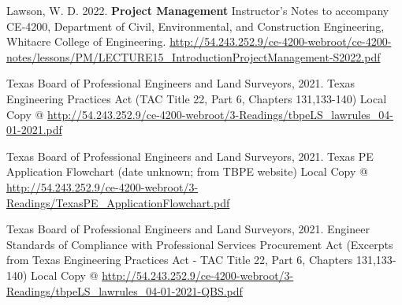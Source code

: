 \documentclass[12pt]{article}
\begin{document}
\begin{thebibliography}{}
Lawson, W. D. 2022. \textbf{Project Management} Instructor's Notes to accompany CE-4200, Department of Civil, Environmental, and Construction Engineering, Whitacre College of Engineering. \url{http://54.243.252.9/ce-4200-webroot/ce-4200-notes/lessons/PM/LECTURE15_IntroductionProjectManagement-S2022.pdf}

Texas Board of Professional Engineers and Land Surveyors, 2021.  
Texas Engineering Practices Act (TAC Title 22, Part 6, Chapters 131,133-140)
Local Copy @ \url{http://54.243.252.9/ce-4200-webroot/3-Readings/tbpeLS_lawrules_04-01-2021.pdf}

Texas Board of Professional Engineers and Land Surveyors, 2021. 
Texas PE Application Flowchart (date unknown; from TBPE website)
Local Copy @ \url{http://54.243.252.9/ce-4200-webroot/3-Readings/TexasPE_ApplicationFlowchart.pdf} 

Texas Board of Professional Engineers and Land Surveyors, 2021.  
Engineer Standards of Compliance with Professional Services Procurement Act (Excerpts from Texas Engineering Practices Act - TAC Title 22, Part 6, Chapters 131,133-140)
Local Copy @ \url{http://54.243.252.9/ce-4200-webroot/3-Readings/tbpeLS_lawrules_04-01-2021-QBS.pdf}

\end{thebibliography}
\end{document}
